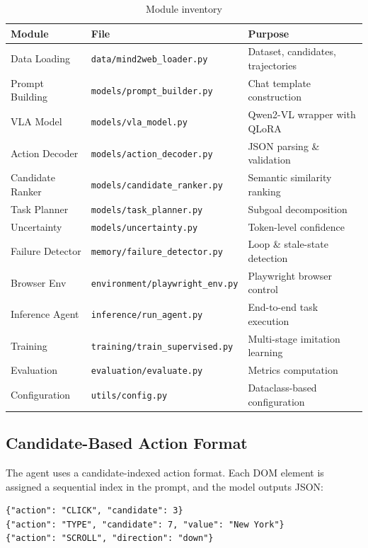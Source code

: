 \documentclass[11pt,a4paper]{article}
\begin{document}
\begin{table}[H]
\centering
\small
\caption{Module inventory}
\begin{tabular}{lll}
\toprule
\textbf{Module} & \textbf{File} & \textbf{Purpose} \\
\midrule
Data Loading     & \texttt{data/mind2web\_loader.py}    & Dataset, candidates, trajectories \\
Prompt Building  & \texttt{models/prompt\_builder.py}    & Chat template construction \\
VLA Model        & \texttt{models/vla\_model.py}         & Qwen2-VL wrapper with QLoRA \\
Action Decoder   & \texttt{models/action\_decoder.py}    & JSON parsing \& validation \\
Candidate Ranker & \texttt{models/candidate\_ranker.py}  & Semantic similarity ranking \\
Task Planner     & \texttt{models/task\_planner.py}      & Subgoal decomposition \\
Uncertainty      & \texttt{models/uncertainty.py}        & Token-level confidence \\
Failure Detector & \texttt{memory/failure\_detector.py}  & Loop \& stale-state detection \\
Browser Env      & \texttt{environment/playwright\_env.py} & Playwright browser control \\
Inference Agent  & \texttt{inference/run\_agent.py}       & End-to-end task execution \\
Training         & \texttt{training/train\_supervised.py} & Multi-stage imitation learning \\
Evaluation       & \texttt{evaluation/evaluate.py}       & Metrics computation \\
Configuration    & \texttt{utils/config.py}              & Dataclass-based configuration \\
\bottomrule
\end{tabular}
\end{table}


\subsection{Candidate-Based Action Format}

The agent uses a candidate-indexed action format. Each DOM element is
assigned a sequential index in the prompt, and the model outputs JSON:

\begin{lstlisting}[style=python]
{"action": "CLICK", "candidate": 3}
{"action": "TYPE", "candidate": 7, "value": "New York"}
{"action": "SCROLL", "direction": "down"}
\end{lstlisting}
\end{document}
